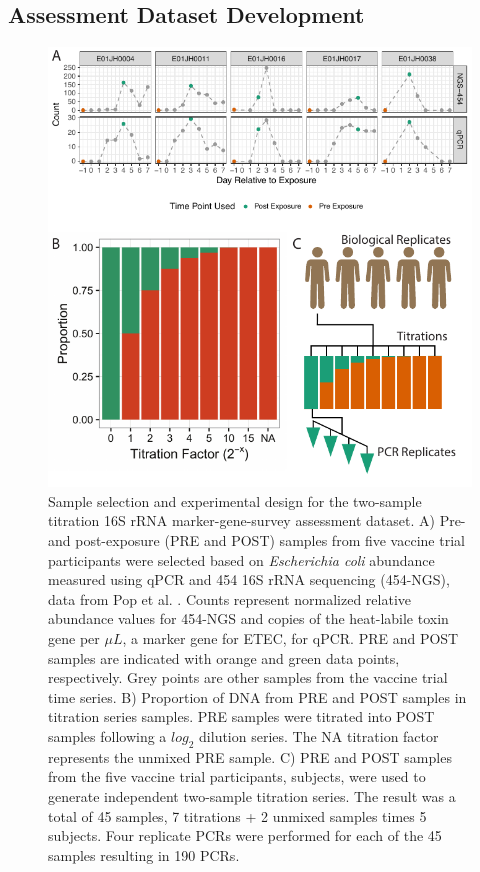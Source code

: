\documentclass[linenumbers]{bmcart}
\begin{document}
\subsection*{Assessment Dataset Development}
\begin{figure}
\centering
\includegraphics{experimentalDesign.pdf}
\caption{\label{fig:countExperimentalDesign}Sample selection and
experimental design for the two-sample titration 16S rRNA
marker-gene-survey assessment dataset. A) Pre- and post-exposure (PRE
and POST) samples from five vaccine trial participants were selected
based on \textit{Escherichia coli} abundance measured using qPCR and 454
16S rRNA sequencing (454-NGS), data from Pop et al. \cite{pop2016individual}.
Counts represent normalized relative abundance values for 454-NGS and
copies of the heat-labile toxin gene per \(\mu L\), a marker gene for
ETEC, for qPCR. PRE and POST samples are indicated with orange and green
data points, respectively. Grey points are other samples from the
vaccine trial time series. B) Proportion of DNA from PRE and POST
samples in titration series samples. PRE samples were titrated into POST
samples following a \(log_2\) dilution series. The NA titration factor
represents the unmixed PRE sample. C) PRE and POST samples from the five
vaccine trial participants, subjects, were used to generate independent
two-sample titration series. The result was a total of 45 samples, 7
titrations + 2 unmixed samples times 5 subjects. Four replicate PCRs
were performed for each of the 45 samples resulting in 190 PCRs.}
\end{figure}
\end{document}
